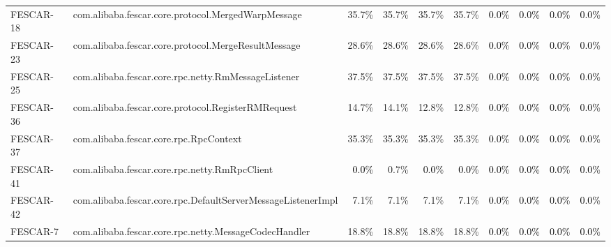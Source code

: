 \begin{tabular}{ ll rrrr rrrr}
FESCAR-18  &  com.alibaba.fescar.core.protocol.MergedWarpMessage & 35.7\% & 35.7\% & 35.7\% & 35.7\% & \cellcolor{light-gray} \textcolor{black}{0.0\%} & \cellcolor{light-gray} \textcolor{black}{0.0\%} & \cellcolor{light-gray} \textcolor{black}{0.0\%} & \cellcolor{light-gray} \textcolor{black}{0.0\%}\\ 
FESCAR-23  &  com.alibaba.fescar.core.protocol.MergeResultMessage & 28.6\% & 28.6\% & 28.6\% & 28.6\% & \cellcolor{light-gray} \textcolor{black}{0.0\%} & \cellcolor{light-gray} \textcolor{black}{0.0\%} & \cellcolor{light-gray} \textcolor{black}{0.0\%} & \cellcolor{light-gray} \textcolor{black}{0.0\%}\\ 
FESCAR-25  &  com.alibaba.fescar.core.rpc.netty.RmMessageListener & 37.5\% & 37.5\% & 37.5\% & 37.5\% & \cellcolor{light-gray} \textcolor{black}{0.0\%} & \cellcolor{light-gray} \textcolor{black}{0.0\%} & \cellcolor{light-gray} \textcolor{black}{0.0\%} & \cellcolor{light-gray} \textcolor{black}{0.0\%}\\ 
FESCAR-36  &  com.alibaba.fescar.core.protocol.RegisterRMRequest & 14.7\% & 14.1\% & 12.8\% & 12.8\% & \cellcolor{light-gray} \textcolor{black}{0.0\%} & \cellcolor{light-gray} \textcolor{black}{0.0\%} & \cellcolor{light-gray} \textcolor{black}{0.0\%} & \cellcolor{light-gray} \textcolor{black}{0.0\%}\\ 
FESCAR-37  &  com.alibaba.fescar.core.rpc.RpcContext & 35.3\% & 35.3\% & 35.3\% & 35.3\% & \cellcolor{light-gray} \textcolor{black}{0.0\%} & \cellcolor{light-gray} \textcolor{black}{0.0\%} & \cellcolor{light-gray} \textcolor{black}{0.0\%} & \cellcolor{light-gray} \textcolor{black}{0.0\%}\\ 
FESCAR-41  &  com.alibaba.fescar.core.rpc.netty.RmRpcClient & \cellcolor{light-gray} \textcolor{black}{0.0\%} & 0.7\% & \cellcolor{light-gray} \textcolor{black}{0.0\%} & \cellcolor{light-gray} \textcolor{black}{0.0\%} & \cellcolor{light-gray} \textcolor{black}{0.0\%} & \cellcolor{light-gray} \textcolor{black}{0.0\%} & \cellcolor{light-gray} \textcolor{black}{0.0\%} & \cellcolor{light-gray} \textcolor{black}{0.0\%}\\ 
FESCAR-42  &  com.alibaba.fescar.core.rpc.DefaultServerMessageListenerImpl & 7.1\% & 7.1\% & 7.1\% & 7.1\% & \cellcolor{light-gray} \textcolor{black}{0.0\%} & \cellcolor{light-gray} \textcolor{black}{0.0\%} & \cellcolor{light-gray} \textcolor{black}{0.0\%} & \cellcolor{light-gray} \textcolor{black}{0.0\%}\\ 
FESCAR-7  &  com.alibaba.fescar.core.rpc.netty.MessageCodecHandler & 18.8\% & 18.8\% & 18.8\% & 18.8\% & \cellcolor{light-gray} \textcolor{black}{0.0\%} & \cellcolor{light-gray} \textcolor{black}{0.0\%} & \cellcolor{light-gray} \textcolor{black}{0.0\%} & \cellcolor{light-gray} \textcolor{black}{0.0\%}\\ 

\end{tabular}
